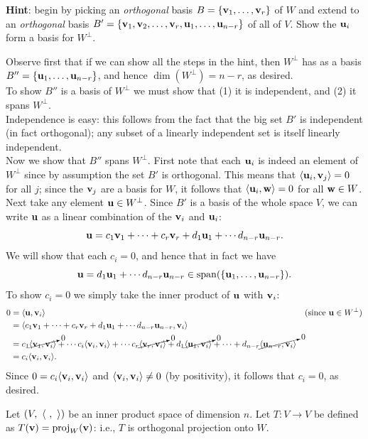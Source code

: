 \noindent
{\bf Hint}: begin by picking an {\em orthogonal} basis $B=\{{\mathbf v}_1,\dots ,{\mathbf v}_r\}$ of $W$ and extend to an {\em orthogonal} basis $B'=\{{\mathbf v}_1,{\mathbf v}_2, \dots, {\mathbf v}_r, {\mathbf u}_1,\dots , {\mathbf u}_{n-r}\}$ of all of $V$. Show the ${\mathbf u}_i$ form a basis for $W^\perp$.  
\\
\begin{solution}
\noindent Observe first that if we can show all the steps in the hint, then $W^\perp$ has as a basis $B''=\{{\mathbf u}_1,\dots, {\mathbf u}_{n-r}\}$, and hence $\dim(W^\perp)=n-r$, as desired. 
\\
To show $B''$ is a basis of $W^\perp$ we must show that (1) it is independent, and (2) it spans $W^\perp$. 
\\
Independence is easy: this follows from the fact that the big set $B'$ is independent (in fact orthogonal); any subset of a linearly independent set is itself linearly independent.
\\
Now we show that $B''$ spans $W^\perp$. First note that each ${\mathbf u}_i$ is indeed an element of $W^\perp$ since by assumption the set $B'$ is orthogonal. This means that $\langle{\mathbf u}_i,{\mathbf v}_j\rangle=0$ for all $j$; since the ${\mathbf v}_j$ are a basis for $W$, it follows that $\langle{\mathbf u}_i,{\mathbf w}\rangle=0$ for all ${\mathbf w}\in W$. 
\\
Next take any element ${\mathbf u}\in W^\perp$. Since $B'$ is a basis of the whole space $V$, we can write ${\mathbf u}$ as a linear combination of the ${\mathbf v}_i$ and ${\mathbf u}_i$:
\[
{\mathbf u}=c_1{\mathbf v}_1+\cdots +c_r{\mathbf v}_r+d_1{\mathbf u}_1+\cdots d_{n-r}{\mathbf u}_{n-r}.
\]
We will show that each $c_i=0$, and hence that in fact we have 
\[
{\mathbf u}=d_1{\mathbf u}_1+\cdots d_{n-r}{\mathbf u}_{n-r}\in\operatorname{span}(\{{\mathbf u}_1,\dots, {\mathbf u}_{n-r}\}). 
\]
To show $c_i=0$ we simply take the inner product of ${\mathbf u}$ with ${\mathbf v}_i$:
\begin{align*}
0&=\langle{\mathbf u},{\mathbf v}_i\rangle &\text{(since ${\mathbf u}\in W^\perp$)}\\
&=\langle c_1{\mathbf v}_1+\cdots +c_r{\mathbf v}_r+d_1{\mathbf u}_1+\cdots d_{n-r}{\mathbf u}_{n-r},{\mathbf v}_i\rangle\\
&=c_1\cancelto{0}{\langle{\mathbf v}_1,{\mathbf v}_i\rangle}+\cdots c_i\langle{\mathbf v}_i,{\mathbf v}_i\rangle+\cdots c_r\cancelto{0}{\langle{\mathbf v}_r,{\mathbf v}_i\rangle}+d_1\cancelto{0}{\langle{\mathbf u}_1,{\mathbf v}_i\rangle}+\cdots +d_{n-r}\cancelto{0}{\langle{\mathbf u}_{n-r},{\mathbf v}_i\rangle}\\
&=c_i\langle{\mathbf v}_i,{\mathbf v}_i\rangle.
\end{align*}
Since $0=c_i\langle{\mathbf v}_i,{\mathbf v}_i\rangle$ and $\langle{\mathbf v}_i,{\mathbf v}_i\rangle\ne 0$ (by positivity), it follows that $c_i=0$, as desired. 

\end{solution}
\ii Let $(V, \ \langle \ , \ \rangle)$ be an inner product space of dimension $n$. Let $T\colon V\rightarrow V$ be defined as $T({\mathbf v})=\mbox{proj}_{W}({{\mathbf v}})$: i.e., $T$ is orthogonal projection onto $W$. 

